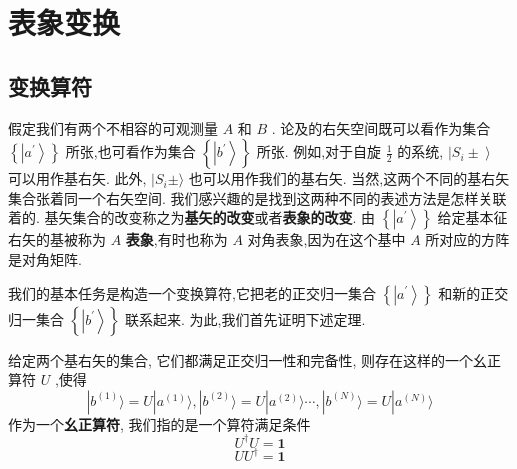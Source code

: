 	\section{表象变换}
	\subsection{变换算符}
	假定我们有两个不相容的可观测量 $A$ 和 $B$ . 论及的右矢空间既可以看作为集合 $\left\{ \left| {a}^{\prime }\right\rangle \right\}$ 所张,也可看作为集合 $\left\{ \left| {b}^{\prime }\right\rangle \right\}$ 所张. 例如,对于自旋 $\frac{1}{2}$ 的系统, $\left| {{S}_{i} \pm }\right\rangle$ 可以用作基右矢. 此外, $| {S}_{i} \pm \rangle$ 也可以用作我们的基右矢. 当然,这两个不同的基右矢集合张着同一个右矢空间. 我们感兴趣的是找到这两种不同的表述方法是怎样关联着的. 基矢集合的改变称之为\textbf{基矢的改变}或者\textbf{表象的改变}. 由 $\left\{ \left| {a}^{\prime }\right\rangle \right\}$ 给定基本征右矢的基被称为 $A$ \textbf{表象},有时也称为 $A$ 对角表象,因为在这个基中 $A$ 所对应的方阵是对角矩阵.
	
	我们的基本任务是构造一个变换算符,它把老的正交归一集合 $\left\{ \left| {a}^{\prime }\right\rangle \right\}$ 和新的正交归一集合 $\left\{ \left| {b}^{\prime }\right\rangle \right\}$ 联系起来. 为此,我们首先证明下述定理.
	
	\begin{theorem}\label{thm:1.3}
		给定两个基右矢的集合, 它们都满足正交归一性和完备性, 则存在这样的一个幺正算符 $U$ ,使得
		\begin{equation}
			| {b}^{( 1) }\rangle = U| {a}^{( 1) }\rangle ,| {b}^{( 2) }\rangle = U| {a}^{( 2) }\rangle \cdots ,| {b}^{( N) }\rangle = U| {a}^{( N) }\rangle
		\end{equation}
		作为一个\textbf{幺正算符}, 我们指的是一个算符满足条件
		\begin{equation}
			{U}^{ \dagger }U = \textbf{1}
		\end{equation}
		\begin{equation}
			U{U}^{ \dagger } = \textbf{1}
		\end{equation}
	\end{theorem}
	

